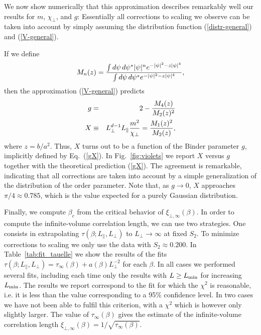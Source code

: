 \documentclass[12pt]{article}
\begin{document}
We now show numerically that this approximation describes remarkably well
our results for $m$, $\chi_\bot$, and $g$: 
Essentially all corrections to scaling 
we observe can be taken into account by simply assuming the 
distribution function (\ref{distr-general}) and (\ref{V-general}). 

If we define
\begin{eqnarray}
M_n(z) = {\int d\psi\, d\psi^* |\psi|^n e^{-|\psi|^2 - z |\psi|^4} \over 
          \int d\psi\, d\psi^* e^{-|\psi|^2 - z |\psi|^4} },
\end{eqnarray}
then the approximation (\ref{V-general}) predicts
\begin{eqnarray}
g &=& 2 - {M_4(z)\over M_2(z)^2} \nonumber \\
X &\equiv & L_\bot^{d-1} L_\| {m^2 \over \chi_\bot} = {M_1(z)^2\over M_2(z)},
\label{gX}
\end{eqnarray}
where $z = b/a^2$. Thus, $X$ turns out to be a function of 
the Binder parameter $g$, 
implicitly defined by Eq.~(\ref{gX}). 
In Fig.~\ref{fig:violets} we report $X$ versus $g$ together 
with the theoretical prediction (\ref{gX}). The agreement is remarkable,
indicating that all corrections are taken into account by a simple 
generalization of the distribution of the order parameter. 
Note that, as $g\to 0$, $X$ approaches $\pi/4\approx 0.785$, which is the value
expected for a purely Gaussian distribution.


Finally, we compute $\beta_c$ from the critical behavior of 
$\xi_{\bot,\infty}(\beta)$.
In order to compute the infinite-volume correlation length, 
we can use two strategies. 
One consists in extrapolating 
$\tau(\beta;L_\|,L_\bot)$ to $L_\bot\to\infty$ at fixed $S_2$. 
To minimize corrections to scaling we only use the data with $S_2\approx 0.200$.
In Table~\ref{tab:fit_tauelle} we show the results of the fits 
$\tau(\beta;L_\|,L_\bot) = \tau_\infty(\beta) + a(\beta) L_\bot^{-2}$ for 
each $\beta$. 
In all cases we performed several fits, including each time only the results
with $L\ge L_{\rm min}$ for increasing $L_{\rm min}$. 
The results we report correspond to the fit for which the 
$\chi^2$ is reasonable, i.e. it is less than the value corresponding 
to a 95\% confidence level. In two cases we have not been able to fulfil 
this criterion, with a $\chi^2$ which is however only slightly larger.
The value of $\tau_\infty(\beta)$ gives
the estimate of the infinite-volume correlation length
$\xi_{\bot,\infty}(\beta) = 1/\sqrt{\tau_\infty(\beta)}$. 
\end{document}
